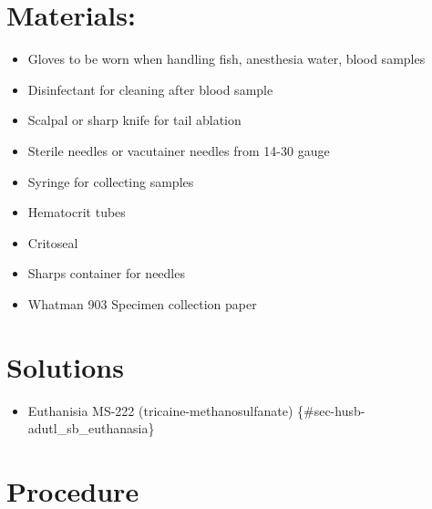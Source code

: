 \documentclass[
  letterpaper,
  DIV=11,
  numbers=noendperiod]{scrreprt}
\providecommand{\tightlist}{%
  \setlength{\itemsep}{0pt}\setlength{\parskip}{0pt}}\usepackage{longtable,booktabs,array}
\begin{document}
\hypertarget{materials}{%
\section{Materials:}\label{materials}}

\begin{itemize}
\tightlist
\item
  Gloves to be worn when handling fish, anesthesia water, blood samples
\item
  Disinfectant for cleaning after blood sample
\item
  Scalpal or sharp knife for tail ablation
\item
  Sterile needles or vacutainer needles from 14-30 gauge
\item
  Syringe for collecting samples
\item
  Hematocrit tubes
\item
  Critoseal
\item
  Sharps container for needles
\item
  Whatman 903 Specimen collection paper
\end{itemize}

\hypertarget{solutions-39}{%
\section{Solutions}\label{solutions-39}}

\begin{itemize}
\tightlist
\item
  Euthanisia MS-222 (tricaine-methanosulfanate)
  \{\#sec-husb-adutl\_sb\_euthanasia\}
\end{itemize}

\hypertarget{procedure-42}{%
\section{Procedure}\label{procedure-42}}
\end{document}
